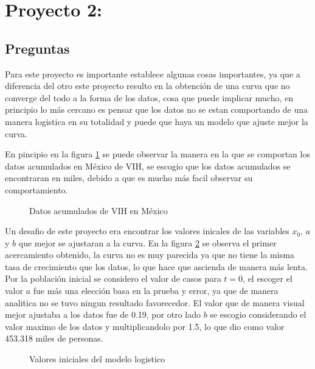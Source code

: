 \documentclass{article}
\begin{document}
\section*{Proyecto 2:}

\subsection*{Preguntas}

Para este proyecto es importante establece algunas cosas importantes, ya que a diferencia del otro este proyecto resulto en la obtención de una curva que no converge del todo a la forma de los datos, cosa que puede implicar mucho, en principio lo más cercano es pensar que los datos no se estan comportando de una manera logistica en su totalidad y puede que haya un modelo que ajuste mejor la curva. 

\vspace{10pt}


En pincipio en la figura \ref{f3} se puede observar la manera en la que se comportan los datos acumulados en México de VIH, se escogio que los datos acumulados se encontraran en miles, debido a que es mucho más facil observar su comportamiento.


\begin{figure}[h!]
    \centering
    \scalebox{0.7}{}
    \caption{Datos acumulados de VIH en México}
    \label{f3}
\end{figure}

Un desafio de este proyecto era encontrar los valores inicales de las variables $x_0$, $a$ y $b$ que mejor se ajustaran a la curva. En la figura \ref{f4} se observa el primer acercamiento obtenido, la curva no es muy parecida ya que no tiene la misma tasa de crecimiento que los datos, lo que hace que ascienda de manera más lenta. Por la población inicial se considero el valor de casos para $t = 0$, el escoger el valor $a$ fue más una elección basa en la prueba y error, ya que de manera analitica no se tuvo ningun resultado favorecedor. El valor que de manera visual mejor ajustaba a los datos fue de 0.19, por otro lado $b$ se escogio considerando el valor maximo de los datos y multiplicandolo por 1.5, lo que dio como valor 453.318 miles de personas. 

\vspace{10pt}

\begin{figure}[h!]
    \centering
    \scalebox{0.7}{}
    \caption{Valores iniciales del modelo logistico}
    \label{f4}
\end{figure}
\end{document}
